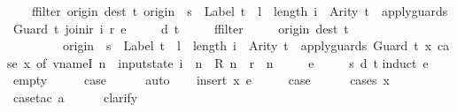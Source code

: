 \begin{isabellebody}
\ \ \ \ ffilter\ {\isacharparenleft}{\isasymlambda}{\isacharparenleft}{\isacharparenleft}origin{\isacharcomma}\ dest{\isacharparenright}{\isacharcomma}\ t{\isacharparenright}{\isachardot}\ origin\ {\isacharequal}\ s\ {\isasymand}\ Label\ t\ {\isacharequal}\ l\ {\isasymand}\ length\ i\ {\isacharequal}\ Arity\ t\ {\isasymand}\ apply{\isacharunderscore}guards\ {\isacharparenleft}Guard\ t{\isacharparenright}\ {\isacharparenleft}join{\isacharunderscore}ir\ i\ r{\isacharparenright}{\isacharparenright}\ e\ {\isacharequal}\isanewline
\ \ \ \ {\isacharbraceleft}{\isacharbar}{\isacharparenleft}d{\isacharcomma}\ t{\isacharparenright}{\isacharbar}{\isacharbraceright}\ {\isasymLongrightarrow}\isanewline
\ \ \ \ ffilter\isanewline
\ \ \ \ \ {\isacharparenleft}{\isasymlambda}{\isacharparenleft}{\isacharparenleft}origin{\isacharcomma}\ dest{\isacharparenright}{\isacharcomma}\ t{\isacharparenright}{\isachardot}\isanewline
\ \ \ \ \ \ \ \ \ origin\ {\isacharequal}\ s\ {\isasymand}\ Label\ t\ {\isacharequal}\ l\ {\isasymand}\ length\ i\ {\isacharequal}\ Arity\ t\ {\isasymand}\ apply{\isacharunderscore}guards\ {\isacharparenleft}Guard\ t{\isacharparenright}\ {\isacharparenleft}{\isasymlambda}x{\isachardot}\ case\ x\ of\ vname{\isachardot}I\ n\ {\isasymRightarrow}\ input{}state\ i\ {\isachardollar}\ n\ {\isacharbar}\ R\ n\ {\isasymRightarrow}\ r\ {\isachardollar}\ n{\isacharparenright}{\isacharparenright}\isanewline
\ \ \ \ \ e\ {\isacharequal}\isanewline
\ \ \ \ {\isacharbraceleft}{\isacharbar}{\isacharparenleft}{\isacharparenleft}s{\isacharcomma}\ d{\isacharparenright}{\isacharcomma}\ t{\isacharparenright}{\isacharbar}{\isacharbraceright}{\isachardoublequoteclose}\isanewline
%
\isadelimproof
%
\endisadelimproof
%
\isatagproof
{}\isamarkupfalse%
{\isacharparenleft}induct\ e{\isacharparenright}\isanewline
\ \ \isamarkupfalse%
\ empty\isanewline
\ \ \isamarkupfalse%
\ \isamarkupfalse%
\ {\isacharquery}case\isanewline
\ \ \ \ \isamarkupfalse%
\ auto\isanewline
{}\isamarkupfalse%
\isanewline
\ \ \isamarkupfalse%
\ {\isacharparenleft}insert\ x\ e{\isacharparenright}\isanewline
\ \ \isamarkupfalse%
\ \isamarkupfalse%
\ {\isacharquery}case\isanewline
\ \ \ \ \isamarkupfalse%
\ {\isacharparenleft}cases\ x{\isacharparenright}\isanewline
\ \ \ \ \isamarkupfalse%
\ {\isacharparenleft}case{\isacharunderscore}tac\ a{\isacharparenright}\isanewline
\ \ \ \ \isamarkupfalse%
\ clarify\isanewline

\end{isabellebody}
